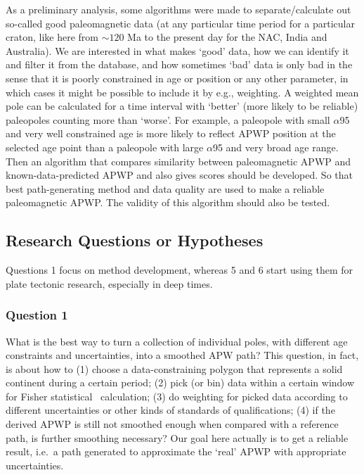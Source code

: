 As a preliminary analysis, some algorithms were made to separate/calculate out
so-called good paleomagnetic data (at any particular time period for a
particular craton, like here from ${\sim}120$ Ma to the present day for the
NAC, India and Australia). We are interested in what makes `good' data, how we
can identify it and
filter it from the database, and how sometimes `bad' data is only bad in the
sense that it is poorly constrained in age or position or any other parameter,
in which cases it might be possible to include it by e.g., weighting. A weighted
mean pole can be calculated for a time interval with `better' (more likely to be
reliable) paleopoles counting more than `worse'. For example, a paleopole with
small $\alpha$95 and very well constrained age is more likely to reflect APWP
position at the selected age point than a paleopole with large $\alpha$95 and
very broad age range. Then an algorithm that compares similarity between
paleomagnetic APWP and known-data-predicted APWP and also gives scores should be
developed. So that best path-generating method and data quality are used to
make a reliable paleomagnetic APWP\@. The validity of this algorithm should also
be tested.

\subsection{Research Questions or Hypotheses}

Questions 1 focus on method development, whereas 5 and 6 start
using them for plate tectonic research, especially in deep times.

\subsubsection{Question 1}

What is the best way to turn a collection of individual poles, with different
age constraints and uncertainties, into a smoothed APW path? This question, in
fact, is about how to (1) choose a data-constraining polygon that represents a
solid continent during a certain period; (2) pick (or bin) data within a certain
window for Fisher statistical~\citep{F53} calculation; (3) do weighting for
picked data according to different uncertainties or other kinds of standards of
qualifications; (4) if the derived APWP is still not smoothed enough when
compared with a reference path, is further smoothing necessary? Our goal here
actually is to get a reliable result, i.e.\ a path generated to approximate the
`real' APWP with appropriate uncertainties.

